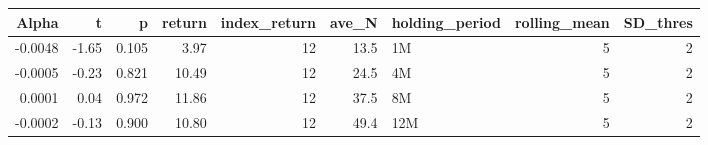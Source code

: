 \begin{table}[ht]
\centering
\begin{tabular}{rrrrrrlrr}
  \hline
Alpha & t & p & return & index\_return & ave\_N & holding\_period & rolling\_mean & SD\_thres \\ 
  \hline
-0.0048 & -1.65 & 0.105 & 3.97 & 12 & 13.5 & 1M &  5 &  2 \\ 
  -0.0005 & -0.23 & 0.821 & 10.49 & 12 & 24.5 & 4M &  5 &  2 \\ 
  0.0001 & 0.04 & 0.972 & 11.86 & 12 & 37.5 & 8M &  5 &  2 \\ 
  -0.0002 & -0.13 & 0.900 & 10.80 & 12 & 49.4 & 12M &  5 &  2 \\ 
   \hline
\end{tabular}
\end{table}

